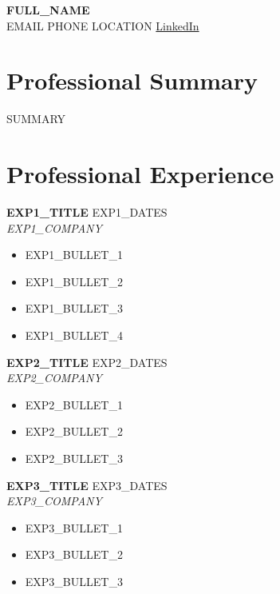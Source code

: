 \documentclass[10pt, letterpaper]{article}
\newcommand{\experienceentry}[4]{
  \textbf{#1} \hfill #3 \\
  \textit{#2} \\[-4pt]
  #4
  \vspace{2pt}
}
\begin{document}
\begin{center}
  {\LARGE\bfseries {{FULL_NAME}}} \\[4pt]
  {{EMAIL}} \textbar{} {{PHONE}} \textbar{} {{LOCATION}} \textbar{} \href{ {{LINKEDIN_URL}} }{LinkedIn}
\end{center}

\section{Professional Summary}
{{SUMMARY}}

\section{Professional Experience}

\experienceentry
  { {{EXP1_TITLE}} }
  { {{EXP1_COMPANY}} }
  { {{EXP1_DATES}} }
  {
\begin{itemize}
  \item {{EXP1_BULLET_1}}
  \item {{EXP1_BULLET_2}}
  \item {{EXP1_BULLET_3}}
  \item {{EXP1_BULLET_4}}
\end{itemize}
  }

\experienceentry
  { {{EXP2_TITLE}} }
  { {{EXP2_COMPANY}} }
  { {{EXP2_DATES}} }
  {
\begin{itemize}
  \item {{EXP2_BULLET_1}}
  \item {{EXP2_BULLET_2}}
  \item {{EXP2_BULLET_3}}
\end{itemize}
  }

\experienceentry
  { {{EXP3_TITLE}} }
  { {{EXP3_COMPANY}} }
  { {{EXP3_DATES}} }
  {
\begin{itemize}
  \item {{EXP3_BULLET_1}}
  \item {{EXP3_BULLET_2}}
  \item {{EXP3_BULLET_3}}
\end{itemize}
  }
\end{document}
